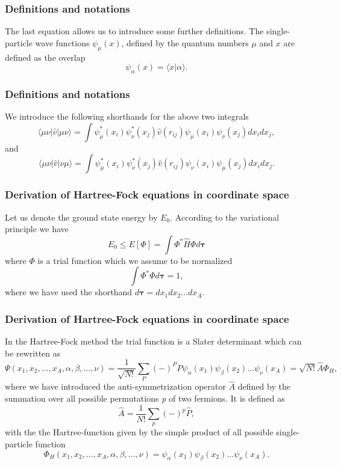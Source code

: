 \documentclass{beamer}
\begin{document}
\begin{frame}
\frametitle{Definitions and notations}

\begin{block}{}
The last equation allows us to  introduce some further definitions.  
The single-particle wave functions $\psi_{\mu}(x)$, defined by the quantum numbers $\mu$ and $x$
are defined as the overlap 
\[
   \psi_{\alpha}(x)  = \langle x | \alpha \rangle .
\]
\end{block}
\end{frame}

\begin{frame}
\frametitle{Definitions and notations}

\begin{block}{}
We introduce the following shorthands for the above two integrals
\[
\langle \mu\nu|\hat{v}|\mu\nu\rangle =  \int \psi_{\mu}^*(x_i)\psi_{\nu}^*(x_j)\hat{v}(r_{ij})\psi_{\mu}(x_i)\psi_{\nu}(x_j)
    dx_idx_j,
\]
and
\[
\langle \mu\nu|\hat{v}|\nu\mu\rangle = \int \psi_{\mu}^*(x_i)\psi_{\nu}^*(x_j)
  \hat{v}(r_{ij})\psi_{\nu}(x_i)\psi_{\mu}(x_j)
  dx_idx_j.  
\]
\end{block}
\end{frame}

\begin{frame}
\frametitle{Derivation of Hartree-Fock equations in coordinate space}

\begin{block}{}
Let us denote the ground state energy by $E_0$. According to the
variational principle we have
\[
  E_0 \le E[\Phi] = \int \Phi^*\hat{H}\Phi d\mathbf{\tau}
\]
where $\Phi$ is a trial function which we assume to be normalized
\[
  \int \Phi^*\Phi d\mathbf{\tau} = 1,
\]
where we have used the shorthand $d\mathbf{\tau}=dx_1dx_2\dots dx_A$.
\end{block}
\end{frame}

\begin{frame}
\frametitle{Derivation of Hartree-Fock equations in coordinate space}

\begin{block}{}
In the Hartree-Fock method the trial function is a Slater
determinant which can be rewritten as 
\[
  \Psi(x_1,x_2,\dots,x_A,\alpha,\beta,\dots,\nu) = \frac{1}{\sqrt{N!}}\sum_{P} (-)^PP\psi_{\alpha}(x_1)
    \psi_{\beta}(x_2)\dots\psi_{\nu}(x_A)=\sqrt{N!}\hat{A}\Phi_H,
\]
where we have introduced the anti-symmetrization operator $\hat{A}$ defined by the 
summation over all possible permutations \emph{p} of two fermions.
It is defined as
\[
  \hat{A} = \frac{1}{N!}\sum_{p} (-)^p\hat{P},
\]
with the the Hartree-function given by the simple product of all possible single-particle function
\[
  \Phi_H(x_1,x_2,\dots,x_A,\alpha,\beta,\dots,\nu) =
  \psi_{\alpha}(x_1)
    \psi_{\beta}(x_2)\dots\psi_{\nu}(x_A).
\]
\end{block}
\end{frame}
\end{document}
